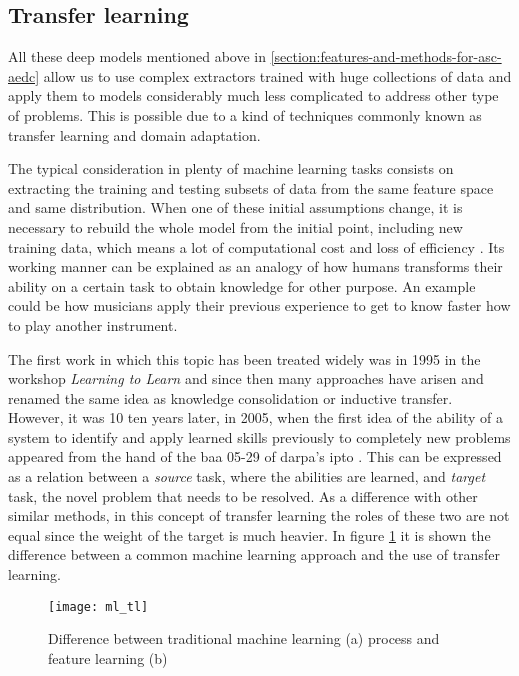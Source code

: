 \subsection{Transfer learning}
\label{subsection:transfer-learning}

	All these deep models mentioned above in \ref{section:features-and-methods-for-asc-aedc} allow us to use complex extractors trained with huge collections of data and apply them to models considerably much less complicated to address other type of problems. This is possible due to a kind of techniques commonly known as transfer learning and domain adaptation.
	
	The typical consideration in plenty of machine learning tasks consists on extracting the training and testing subsets of data from the same feature space and same distribution. When one of these initial assumptions change, it is necessary to rebuild the whole model from the initial point, including new training data, which means a lot of computational cost and loss of efficiency \cite{Pan2010}. Its working manner can be explained as an analogy of how humans transforms their ability on a certain task to obtain knowledge for other purpose. An example could be how musicians apply their previous experience to get to know faster how to play another instrument.
	
	The first work in which this topic has been treated widely was in 1995 in the workshop \textit{Learning to Learn} \cite{Sarkar2018} and since then many approaches have arisen and renamed the same idea as knowledge consolidation or inductive transfer. However, it was 10 ten years later, in 2005, when the first idea of the ability of a system to identify and apply learned skills previously to completely new problems appeared from the hand of the \acrfull{baa} 05-29 of \acrfull{darpa}’s \acrfull{ipto} \cite{Pan2010}. This can be expressed as a relation between a \textit{source} task, where the abilities are learned, and \textit{target} task, the novel problem that needs to be resolved. As a difference with other similar methods, in this concept of transfer learning the roles of these two are not equal since the weight of the target is much heavier. In figure \ref{fig:mesh4} it is shown the difference between a common machine learning approach and the use of transfer learning.
	
	\begin{figure}[h]
		\centering
		\captionsetup{justification=centering}
		\texttt{[image: ml\_tl]}
		\caption{Difference between traditional machine learning (a) process and feature learning (b) \cite{Pan2010}}
		\label{fig:mesh4}
	\end{figure}
	

